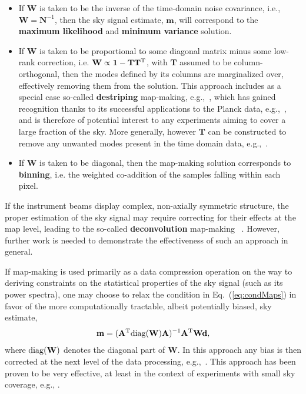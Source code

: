 \begin{itemize}
\item If $\mathbf{W}$ is taken to be the inverse of the time-domain noise covariance, i.e., $\mathbf{W} = \mathbf{N}^{-1}$, then the sky signal estimate, $\mathbf{m}$, will correspond to the {\bf maximum likelihood} and {\bf minimum variance} solution. 
\item If $\mathbf{W}$ is taken to be proportional to some diagonal matrix minus some low-rank correction, i.e. $\mathbf{W} \propto \mathbf{1} - \mathbf{T}\mathbf{T}^{\rm T}$,  with $\mathbf{T}$ assumed to be column-orthogonal, then the modes defined by its columns are marginalized over, effectively removing them from the solution. This approach includes as a special case so-called {\bf destriping} map-making, e.g.,~\cite{Poutanen2004, Keihanen2004}, which has gained recognition thanks to its successful applications to the Planck data, e.g.,~\cite{Keihanen2010, Tristram2011, LFIMaps2015, HFImaps2015}, and is therefore of potential interest to any experiments aiming to cover a large fraction of the sky. More generally, however $\mathbf{T}$ can be constructed to remove any unwanted modes present in the time domain data, e.g.,~\cite{Stompor2001, Cantalupo2010, Dunner2013}.
\item If $\mathbf{W}$ is taken to be diagonal, then the map-making solution corresponds to {\bf binning}, i.e. the weighted co-addition of the samples falling within each pixel.
\end{itemize}
If the instrument beams display complex, non-axially symmetric structure, the proper estimation of the sky signal may require correcting for their effects at the map level, leading to the so-called {\bf deconvolution} map-making ~\cite{ArmitageWandelt2004, Harrison2011, KeihanenReinecke2012}.  However, further work is needed to demonstrate the effectiveness of such an approach in general.

If map-making is used primarily as a data compression operation on the way to deriving constraints on the statistical properties of the sky signal (such as its power spectra), one may choose to relax the condition in Eq.~(\ref{eq:condMaps}) in favor of the more computationally tractable, albeit potentially biased, sky estimate,
\begin{eqnarray}
\mathbf{m} = (\mathbf{A}^{\rm T} {\rm diag}( \mathbf{W}) \mathbf{A})^{-1} \mathbf{A}^{\rm T}\mathbf{W} \mathbf{d},
\end{eqnarray}
where ${\rm diag}( \mathbf{W})$ denotes the diagonal part of $\mathbf{W}$. In this approach any bias is then corrected at the next level of the data processing, e.g.,~\cite{Hivon2002}. This approach has been proven to be very effective, at least in the context of experiments with small sky coverage, e.g., \cite{QUAD2010, SPT2011, POLARBEAR, BICEP2014}.

